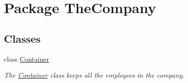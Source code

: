\hypertarget{namespace_the_company}{\section{Package The\-Company}
\label{namespace_the_company}
}
\subsection*{Classes}
\begin{DoxyCompactItemize}
\item 
class \hyperlink{class_the_company_1_1_container}{Container}
\begin{DoxyCompactList}\small\item\em The \hyperlink{class_the_company_1_1_container}{Container} class keeps all the employees in the company. \end{DoxyCompactList}\end{DoxyCompactItemize}
